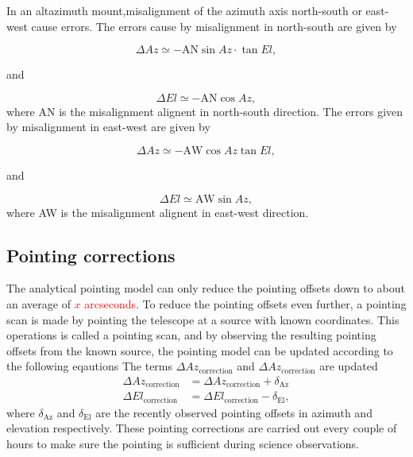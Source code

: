 In an altazimuth mount,misalignment of the azimuth axis north-south or east-west cause errors.
The errors cause by misalignment in north-south are given by

\begin{equation}
    \Delta Az \simeq - \text{AN} \sin{Az} \cdot \tan{El},
\end{equation}

and

\begin{equation}
    \Delta El \simeq - \text{AN} \cos{Az},
\end{equation}
where AN is the misalignment alignent in north-south direction.
The errors given by misalignment in east-west are given by

\begin{equation}
    \Delta Az \simeq - \text{AW} \cos{Az} \tan{El},
\end{equation}

and

\begin{equation}
    \Delta El \simeq \text{AW} \sin{Az},
\end{equation}
where AW is the misalignment alignent in east-west direction.



\subsection{Pointing corrections} 
The analytical pointing model can only reduce the pointing offsets down to about an average of \textcolor{red}{$x$ arcseconds}.
To reduce the pointing offsets even further, a pointing scan is made by pointing the telescope at a source with known coordinates. 
This operations is called a pointing scan, and by observing the resulting pointing offsets from the known source,
the pointing model can be updated according to the following eqautions
The terms $\Delta Az_\text{correction}$ and $\Delta Az_\text{correction}$ are updated
\begin{align}
    \Delta Az_\text{correction} &= \Delta Az_\text{correction} + \delta_{\text{Az}} \label{eq:ca}\\ 
    \Delta El_\text{correction} &= \Delta El_\text{correction} - \delta_{\text{El}},\label{eq:ie}
\end{align}
where $\delta_{\text{Az}}$ and $\delta_{\text{El}}$ are the recently observed pointing offsets in azimuth and elevation respectively.
These pointing corrections are carried out every couple of hours to make sure the pointing is sufficient during science observations.

